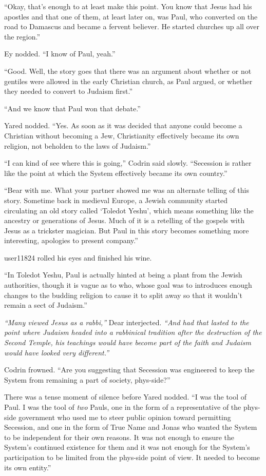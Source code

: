 ``Okay, that's enough to at least make this point. You know that Jesus had his apostles and that one of them, at least later on, was Paul, who converted on the road to Damascus and became a fervent believer. He started churches up all over the region.''

Ey nodded. ``I know of Paul, yeah.''

``Good. Well, the story goes that there was an argument about whether or not gentiles were allowed in the early Christian church, as Paul argued, or whether they needed to convert to Judaism first.''

``And we know that Paul won that debate.''

Yared nodded. ``Yes. As soon as it was decided that anyone could become a Christian without becoming a Jew, Christianity effectively became its own religion, not beholden to the laws of Judaism.''

``I can kind of see where this is going,'' Codrin said slowly. ``Secession is rather like the point at which the System effectively became its own country.''

``Bear with me. What your partner showed me was an alternate telling of this story. Sometime back in medieval Europe, a Jewish community started circulating an old story called `Toledot Yeshu', which means something like the ancestry or generations of Jesus. Much of it is a retelling of the gospels with Jesus as a trickster magician. But Paul in this story becomes something more interesting, apologies to present company.''

user11824 rolled his eyes and finished his wine.

``In Toledot Yeshu, Paul is actually hinted at being a plant from the Jewish authorities, though it is vague as to who, whose goal was to introduces enough changes to the budding religion to cause it to split away so that it wouldn't remain a sect of Judaism.''

\emph{``Many viewed Jesus as a rabbi,''} Dear interjected. \emph{``And had that lasted to the point where Judaism headed into a rabbinical tradition after the destruction of the Second Temple, his teachings would have become part of the faith and Judaism would have looked very different.''}

Codrin frowned. ``Are you suggesting that Secession was engineered to keep the System from remaining a part of society, phys-side?''

There was a tense moment of silence before Yared nodded. ``I was the tool of Paul. I was the tool of \emph{two} Pauls, one in the form of a representative of the phys-side government who used me to steer public opinion toward permitting Secession, and one in the form of True Name and Jonas who wanted the System to be independent for their own reasons. It was not enough to ensure the System's continued existence for them and it was not enough for the System's participation to be limited from the phys-side point of view. It needed to become its own entity.''

